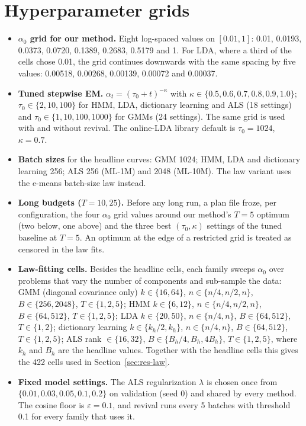 \documentclass[10pt]{article}
\begin{document}
\section{Hyperparameter grids}\label{app:grids}
\begin{itemize}[nosep]
  \item \textbf{$\alpha_0$ grid for our method.} Eight log-spaced values on $[0.01, 1]$: 0.01, 0.0193, 0.0373,
        0.0720, 0.1389, 0.2683, 0.5179 and 1. For LDA, where a third of the cells chose 0.01, the grid continues
        downwards with the same spacing by five values: 0.00518, 0.00268, 0.00139, 0.00072 and 0.00037.
  \item \textbf{Tuned stepwise EM.} $\alpha_t = (\tau_0 + t)^{-\kappa}$ with $\kappa \in \{0.5, 0.6, 0.7, 0.8, 0.9,
        1.0\}$; $\tau_0 \in \{2, 10, 100\}$ for HMM, LDA, dictionary learning and ALS (18 settings) and $\tau_0 \in
        \{1, 10, 100, 1000\}$ for GMMs (24 settings). The same grid is used with and without revival. The
        online-LDA library default is $\tau_0 = 1024$, $\kappa = 0.7$.
  \item \textbf{Batch sizes} for the headline curves: GMM 1024; HMM, LDA and dictionary learning 256; ALS 256
        (ML-1M) and 2048 (ML-10M). The law variant uses the e-means batch-size law instead.
  \item \textbf{Long budgets ($T = 10, 25$).} Before any long run, a plan file froze, per configuration, the four
        $\alpha_0$ grid values around our method's $T = 5$ optimum (two below, one above) and the three best
        $(\tau_0, \kappa)$ settings of the tuned baseline at $T = 5$. An optimum at the edge of a restricted grid is
        treated as censored in the law fits.
  \item \textbf{Law-fitting cells.} Besides the headline cells, each family sweeps $\alpha_0$ over problems that
        vary the number of components and sub-sample the data: GMM (diagonal covariance only) $k \in \{16, 64\}$,
        $n \in \{n/4, n/2, n\}$, $B \in \{256, 2048\}$, $T \in \{1, 2, 5\}$; HMM $k \in \{6, 12\}$, $n \in \{n/4,
        n/2, n\}$, $B \in \{64, 512\}$, $T \in \{1, 2, 5\}$; LDA $k \in \{20, 50\}$, $n \in \{n/4, n\}$, $B \in
        \{64, 512\}$, $T \in \{1, 2\}$; dictionary learning $k \in \{k_h/2, k_h\}$, $n \in \{n/4, n\}$, $B \in \{64,
        512\}$, $T \in \{1, 2, 5\}$; ALS rank $\in \{16, 32\}$, $B \in \{B_h/4, B_h, 4B_h\}$, $T \in \{1, 2, 5\}$,
        where $k_h$ and $B_h$ are the headline values. Together with the headline cells this gives the 422 cells used
        in Section~\ref{sec:res-law}.
  \item \textbf{Fixed model settings.} The ALS regularization $\lambda$ is chosen once from $\{0.01, 0.03, 0.05,
        0.1, 0.2\}$ on validation (seed 0) and shared by every method. The cosine floor is $\varepsilon = 0.1$, and
        revival runs every 5 batches with threshold 0.1 for every family that uses it.
\end{itemize}
\end{document}

